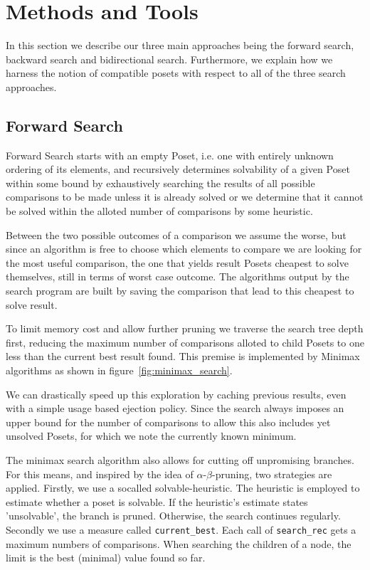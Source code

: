 \documentclass[10pt,journal,compsoc]{IEEEtran}
\begin{document}
\section{Methods and Tools}
In this section we describe our three main approaches being the forward search, backward search and bidirectional search. Furthermore, we explain how we harness the notion of compatible posets with respect to all of the three search approaches.

\subsection{Forward Search}\label{chapter:forward_search}
Forward Search starts with an empty Poset, i.e. one with entirely unknown ordering of its elements,
and recursively determines solvability of a given Poset within some bound by exhaustively searching
the results of all possible comparisons to be made unless it is already solved or we determine that
it cannot be solved within the alloted number of comparisons by some heuristic.

Between the two possible outcomes of a comparison we assume the worse, but since an algorithm is
free to choose which elements to compare we are looking for the most useful comparison, the one that
yields result Posets cheapest to solve themselves, still in terms of worst case outcome. The
algorithms output by the search program are built by saving the comparison that lead to this
cheapest to solve result.

To limit memory cost and allow further pruning we traverse the search tree depth first, reducing the
maximum number of comparisons alloted to child Posets to one less than the current best result
found. This premise is implemented by Minimax algorithms as shown in
figure~\ref{fig:minimax_search}.

We can drastically speed up this exploration by caching previous results, even with a simple usage
based ejection policy. Since the search always imposes an upper bound for the number of comparisons
to allow this also includes yet unsolved Posets, for which we note the currently known minimum.

The minimax search algorithm also allows for cutting off unpromising branches. For this means, and inspired by the idea of $\alpha$-$\beta$-pruning, two strategies are applied.
Firstly, we use a socalled solvable-heuristic.
The heuristic is employed to estimate whether a poset is solvable. If the heuristic's estimate states 'unsolvable', the branch is pruned.
Otherwise, the search continues regularly.
Secondly we use a measure called \texttt{current\_best}.
Each call of \texttt{search\_rec} gets a maximum numbers of comparisons. When searching the children of a node, the limit is the best (minimal) value found so far.
\end{document}
